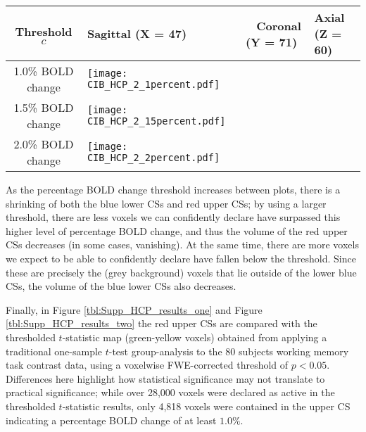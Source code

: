 \begin{table}[htbp]
\hspace*{-0.5cm}
\begin{adjustbox}{center}
\centering
    \begin{tabular}{cm{50mm}m{50mm}m{50mm}}
       \toprule
         Threshold $c$ & \hspace{1.4cm} Sagittal (X = 47) & \ \hspace{1.2cm} Coronal (Y = 71) & \hspace{1.0cm} Axial (Z = 60)\\
        \midrule
        1.0\% BOLD change & \texttt{[image: CIB\_HCP\_2\_1percent.pdf]}\\
        1.5\% BOLD change & \texttt{[image: CIB\_HCP\_2\_15percent.pdf]}\\
        2.0\% BOLD change & \texttt{[image: CIB\_HCP\_2\_2percent.pdf]}\\
        \bottomrule
    \end{tabular}
\end{adjustbox}
    \label{tbl:HCP_results_two}
\end{table}

As the percentage BOLD change threshold increases between plots, there is a shrinking of both the blue lower CSs and red upper CSs; by using a larger threshold, there are less voxels we can confidently declare have surpassed this higher level of percentage BOLD change, and thus the volume of the red upper CSs decreases (in some cases, vanishing). At the same time, there are more voxels we expect to be able to confidently declare have fallen below the threshold. Since these are precisely the (grey background) voxels that lie outside of the lower blue CSs, the volume of the blue lower CSs also decreases. 

Finally, in Figure \ref{tbl:Supp_HCP_results_one} and Figure \ref{tbl:Supp_HCP_results_two} the red upper CSs are compared with the thresholded $t$-statistic map (green-yellow voxels) obtained from applying a traditional one-sample $t$-test group-analysis to the 80 subjects working memory task contrast data, using a voxelwise FWE-corrected threshold of $p < 0.05$. Differences here highlight how statistical significance may not translate to practical significance; while over 28,000 voxels were declared as active in the thresholded $t$-statistic results, only 4,818 voxels were contained in the upper CS indicating a percentage BOLD change of at least $1.0\%$. 

